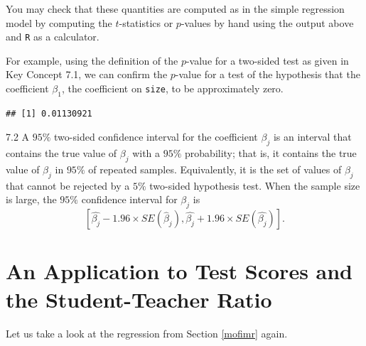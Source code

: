 \documentclass[]{book}
\newenvironment{Shaded}{\begin{snugshade}}{\end{snugshade}}
\newcommand{\KeywordTok}[1]{\textcolor[rgb]{0.13,0.29,0.53}{\textbf{#1}}}
\newcommand{\DataTypeTok}[1]{\textcolor[rgb]{0.13,0.29,0.53}{#1}}
\newcommand{\DecValTok}[1]{\textcolor[rgb]{0.00,0.00,0.81}{#1}}
\newcommand{\StringTok}[1]{\textcolor[rgb]{0.31,0.60,0.02}{#1}}
\newcommand{\OperatorTok}[1]{\textcolor[rgb]{0.81,0.36,0.00}{\textbf{#1}}}
\newcommand{\NormalTok}[1]{#1}
\theoremstyle{definition}
\theoremstyle{definition}
\theoremstyle{definition}
\theoremstyle{remark}
\begin{document}
You may check that these quantities are computed as in the simple
regression model by computing the \(t\)-statistics or \(p\)-values by
hand using the output above and \texttt{R} as a calculator.

For example, using the definition of the \(p\)-value for a two-sided
test as given in Key Concept 7.1, we can confirm the \(p\)-value for a
test of the hypothesis that the coefficient \(\beta_1\), the coefficient
on \texttt{size}, to be approximately zero.

\begin{Shaded}
\end{Shaded}

\begin{verbatim}
## [1] 0.01130921
\end{verbatim}

\begin{keyconcepts}{7.2}
A $95\%$ two-sided confidence interval for the coefficient $\beta_j$ is an interval that contains the true value of $\beta_j$ with a $95 \%$ probability; that is, it contains the true value of $\beta_j$ in $95 \%$ of repeated samples. Equivalently, it is the set of values of $\beta_j$ that cannot be rejected by a $5 \%$ two-sided hypothesis test. When the sample size is large, the $95 \%$ confidence interval for $\beta_j$ is
$$\left[\hat{\beta_j}- 1.96 \times SE(\hat{\beta}_j), \hat{\beta_j} + 1.96 \times SE(\hat{\beta_j})\right].$$
\end{keyconcepts}

\section{An Application to Test Scores and the Student-Teacher
Ratio}\label{an-application-to-test-scores-and-the-student-teacher-ratio}

Let us take a look at the regression from Section \ref{mofimr} again.
\end{document}
